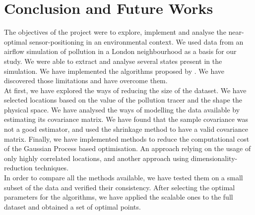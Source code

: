 \chapter{Conclusion and Future Works}


%
%
%

The objectives of the project were to explore, implement and analyse the near-optimal sensor-positioning in an environmental context. We used data from an airflow simulation of pollution in a London neighbourhood as a basis for our study. We were able to extract and analyse several states present in the simulation. We have implemented the algorithms proposed by \citet{krause_near-optimal_2008}. We have discovered those limitations and have overcome them. \\

At first, we have explored the ways of reducing the size of the dataset. We have selected locations based on the value of the pollution tracer and the shape the physical space. We have analysed the ways of modelling the data available by estimating its covariance matrix. We have found that the sample covariance was not a good estimator, and used the shrinkage method to have a valid covariance matrix. Finally, we have implemented methods to reduce the computational cost of the Gaussian Process based optimisation. An approach relying on the usage of only highly correlated locations, and another approach using dimensionality-reduction techniques. \\

In order to compare all the methods available, we have tested them on a small subset of the data and verified their consistency. After selecting the optimal parameters for the algorithms, we have applied the scalable ones to the full dataset and obtained a set of optimal points. \\

